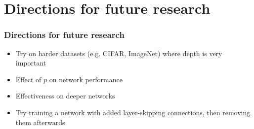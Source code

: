 \documentclass[pdf]{beamer}
\begin{document}
\section{Directions for future research}
\begin{frame}
	\frametitle{Directions for future research}
	\begin{itemize}
		\item<1-> Try on harder datasets (e.g. CIFAR, ImageNet) where depth is very important
		\item<2-> Effect of $p$ on network performance
		\item<3-> Effectiveness on deeper networks
		\item<4-> Try training a network with added layer-skipping connections, then removing them afterwards
	\end{itemize}
\end{frame}
\end{document}
